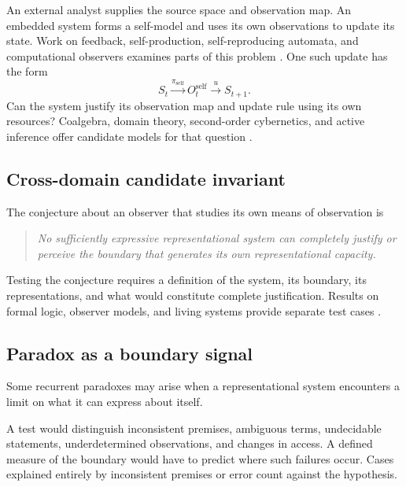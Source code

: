 An external analyst supplies the source space and observation map. An embedded system forms a self-model and uses its own observations to update its state. Work on feedback, self-production, self-reproducing automata, and computational observers examines parts of this problem \parencite{Wiener1948,VonFoerster1981,MaturanaVarela1980,Rosen1991,VonNeumann1966,Wolfram2023ObserverTheory,RicklesEtAl2023}. One such update has the form
\[
S_t\xrightarrow{\pi_{\mathrm{self}}}O^{\mathrm{self}}_t
\xrightarrow{u}S_{t+1}.
\]
Can the system justify its observation map and update rule using its own resources? Coalgebra, domain theory, second-order cybernetics, and active inference offer candidate models for that question \parencite{VonFoerster1981,Abramsky2025,Friston2025ScaleFree}.

\subsection{Cross-domain candidate invariant}

The conjecture about an observer that studies its own means of observation is
\begin{quote}
\emph{No sufficiently expressive representational system can completely justify or perceive the boundary that generates its own representational capacity.}
\end{quote}
Testing the conjecture requires a definition of the system, its boundary, its representations, and what would constitute complete justification. Results on formal logic, observer models, and living systems provide separate test cases \parencite{Godel1931,Tarski1936,Lawvere1969,Elshatlawy2025,Abramsky2025}.

\subsection{Paradox as a boundary signal}

\begin{hypothesis}
Some recurrent paradoxes may arise when a representational system encounters a limit on what it can express about itself.
\end{hypothesis}
A test would distinguish inconsistent premises, ambiguous terms, undecidable statements, underdetermined observations, and changes in access. A defined measure of the boundary would have to predict where such failures occur. Cases explained entirely by inconsistent premises or error count against the hypothesis.

